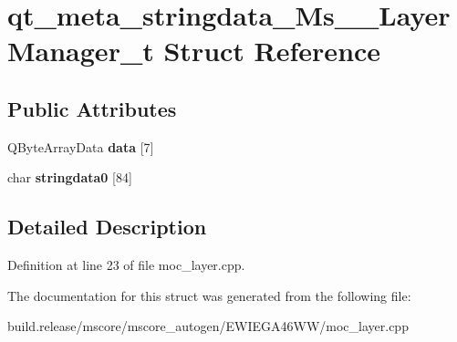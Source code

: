 \hypertarget{structqt__meta__stringdata___ms_____layer_manager__t}{}\section{qt\+\_\+meta\+\_\+stringdata\+\_\+\+Ms\+\_\+\+\_\+\+Layer\+Manager\+\_\+t Struct Reference}
\label{structqt__meta__stringdata___ms_____layer_manager__t}
\subsection*{Public Attributes}
\begin{DoxyCompactItemize}
\item 
\mbox{\label{structqt__meta__stringdata___ms_____layer_manager__t_ab746ba3f01a888572bf07a08bf5f14d6}} 
Q\+Byte\+Array\+Data {\bfseries data} \mbox{[}7\mbox{]}
\item 
\mbox{\label{structqt__meta__stringdata___ms_____layer_manager__t_ab3a7c1aa954360e8793681283a8ff922}} 
char {\bfseries stringdata0} \mbox{[}84\mbox{]}
\end{DoxyCompactItemize}


\subsection{Detailed Description}


Definition at line 23 of file moc\+\_\+layer.\+cpp.



The documentation for this struct was generated from the following file\+:\begin{DoxyCompactItemize}
\item 
build.\+release/mscore/mscore\+\_\+autogen/\+E\+W\+I\+E\+G\+A46\+W\+W/moc\+\_\+layer.\+cpp\end{DoxyCompactItemize}
